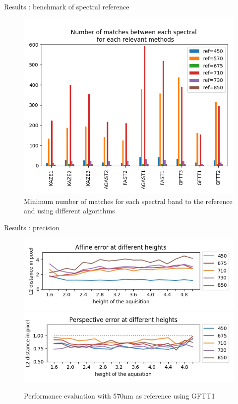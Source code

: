 \documentclass{beamer}
\begin{document}
		\begin{frame}{Results : benchmark of spectral reference}
			\begin{figure}
				\includegraphics[width=0.6\linewidth]{../figures/comparaison-keypoint-matching-reference-merged.png}
				\caption{Minimum number of matches for each spectral band to the reference and using different algorithms}
			\end{figure}
		\end{frame}
	
		\begin{frame}{Results : precision}
			\begin{figure}
				\includegraphics[width=0.8\linewidth]{../figures/affine-allignement-rmse.jpg} \\
				\includegraphics[width=0.8\linewidth]{../figures/prespective-allignement-rmse.jpg}
				\caption{Performance evaluation with 570nm as reference using GFTT1}
			\end{figure}
		\end{frame}
	
\end{document}
